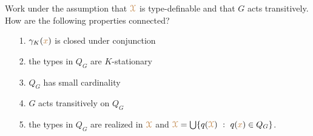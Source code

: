 \begin{question}
  Work under the assumption that ${\color{brown}\EuScript X}$ is type-definable and that $G$ acts transitively.
  How are the following properties connected?
  \begin{itemize}
    \item [1.] $\gamma_K({\color{brown} x})$ is closed under conjunction
    \item [2.] the types in $Q_G$ are $K$-stationary
    \item [3.] $Q_G$ has small cardinality
    \item [4.] $G$ acts transitively on $Q_G$
    \item [5.] the types in $Q_G$ are realized in ${\color{brown}\EuScript X}$ and ${\color{brown}\EuScript X}=\bigcup\{q({\color{brown}\EuScript X})\ :\ q({\color{brown} x})\in Q_G\}$.
  \end{itemize}
\end{question}














